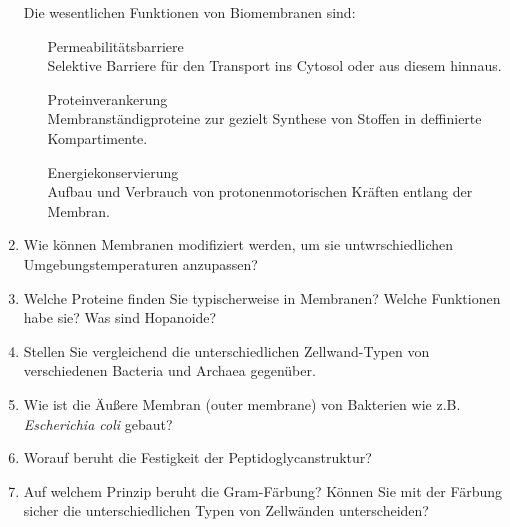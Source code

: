 \begin{enumerate}
			Die wesentlichen Funktionen von Biomembranen sind:

			\begin{itemize}
				\item[Permeabilitätsbarriere] \hfill \\
				Selektive Barriere für den Transport ins Cytosol oder aus diesem hinnaus.
				\item[Proteinverankerung] \hfill \\
				Membranständigproteine zur gezielt Synthese von Stoffen in deffinierte Kompartimente.
				\item[Energiekonservierung] \hfill \\
				Aufbau und Verbrauch von protonenmotorischen Kräften entlang der Membran.
			\end{itemize}

		\item Wie können Membranen modifiziert werden, um sie untwrschiedlichen Umgebungstemperaturen anzupassen?
		\item Welche Proteine finden Sie typischerweise in Membranen? Welche Funktionen habe sie? Was sind Hopanoide?
		\item Stellen Sie vergleichend die unterschiedlichen Zellwand-Typen von verschiedenen Bacteria und Archaea gegenüber.
		\item Wie ist die Äußere Membran (outer membrane) von Bakterien wie z.B. \emph{Escherichia coli} gebaut?
		\item Worauf beruht die Festigkeit der Peptidoglycanstruktur? 
		\item Auf welchem Prinzip beruht die Gram-Färbung? Können Sie mit der Färbung sicher die unterschiedlichen Typen von Zellwänden unterscheiden?
	\end{enumerate}

